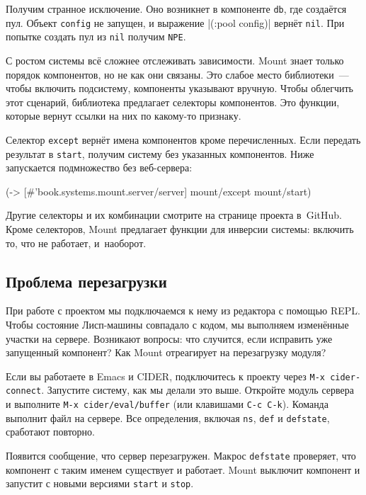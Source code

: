 Получим странное исключение. Оно возникнет в компоненте \verb|db|, где создаётся
пул. Объект \verb|config| не запущен, и выражение \spverb|(:pool config)| вернёт
\verb|nil|. При попытке создать пул из \verb|nil| получим \verb|NPE|.

С ростом системы всё сложнее отслеживать зависимости. Mount знает только порядок
компонентов, но не как они связаны. Это слабое место библиотеки~--- чтобы
включить подсистему, компоненты указывают вручную. Чтобы облегчить этот
сценарий, библиотека предлагает селекторы компонентов. Это функции, которые
вернут ссылки на них по какому-то признаку.

Селектор \verb|except| вернёт имена компонентов кроме перечисленных. Если
передать результат в \verb|start|, получим систему без указанных
компонентов. Ниже запускается подмножество без веб-сервера:

\begin{english}
  \begin{clojure}
(-> [#'book.systems.mount.server/server]
    mount/except
    mount/start)
  \end{clojure}
\end{english}

Другие селекторы и их комбинации смотрите на странице проекта в~GitHub. Кроме
селекторов, Mount предлагает функции для инверсии системы: включить то, что не
работает, и~наоборот.

\subsection{Проблема перезагрузки}

При работе с проектом мы подключаемся к нему из редактора с помощью REPL. Чтобы
состояние Лисп-машины совпадало с кодом, мы выполняем изменённые участки на
сервере. Возникают вопросы: что случится, если исправить уже запущенный
компонент? Как Mount отреагирует на перезагрузку модуля?


Если вы работаете в Emacs и CIDER, подключитесь к проекту через
\verb|M-x cider-connect|. Запустите систему, как мы делали это выше.
Откройте модуль сервера и выполните \texttt{M-x~cider\-/eval\-/buffer}
(или клавишами \verb|C-c C-k|). Команда выполнит файл на сервере.
Все определения, включая \verb|ns|, \verb|def| и \verb|defstate|,
сработают повторно.

Появится сообщение, что сервер перезагружен. Макрос \texttt{def\-state} проверяет,
что компонент с таким именем существует и работает. Mount выключит компонент и
запустит с новыми версиями \verb|start| и \verb|stop|.

